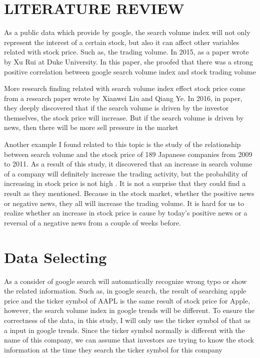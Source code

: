 \documentclass[12pt]{article}
\begin{document}
\section{LITERATURE REVIEW}
As a public data which provide by google, the search volume index will not only represent the interest of a certain stock, but also it can affect other variables related with stock price. Such as, the trading volume. In 2015, as a paper wrote by Xu Rui at Duke University. In this paper, she proofed that there was a strong positive correlation between google search volume index and stock trading volume  \cite{xu2015}
\newline

\newline
More research finding related with search volume index effect stock price come from a research paper wrote by Xianwei Liu and Qiang Ye. In 2016, in paper, they deeply discovered that if the search volume is driven by the investor themselves, the stock price will increase. But if the search volume is driven by news, then there will be more sell pressure in the market \cite{liu2016different}
\newline

\newline
Another example I found related to this topic is the study of the relationship between search volume and the stock price of 189 Japanese companies from 2009 to 2011. As a result of this study, it discovered that an increase in search volume of a company will definitely increase the trading activity, but the probability of increasing in stock price is not high \cite{takeda2014google}. It is not a surprise that they could find a result as they mentioned. Because in the stock market, whether the positive news or negative news, they all will increase the trading volume. It is hard for us to realize whether an increase in stock price is cause by today’s positive news or a reversal of a negative news from a couple of weeks before.
\section{Data Selecting}
As a consider of google search will automatically recognize wrong typo or show the related information. Such as, in google search, the result of searching apple price and the ticker symbol of AAPL is the same result of stock price for Apple, however, the search volume index in google trends will be different. To ensure the correctness of the data, in this study, I will only use the ticker symbol of that as a input in google trends. Since the ticker symbol normally is different with the name of this company, we can assume that investors are trying to know the stock information at the time they search the ticker symbol for this company \cite{xu2015}
\newline
\end{document}
